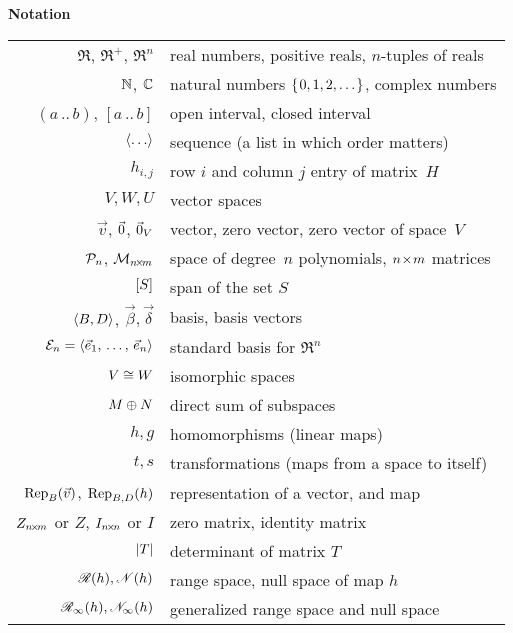 \thispagestyle{empty}
\begin{center}
  \textbf{Notation}  \\[2ex]
  \begin{tabular}{r|l}
    \( \Re \), \( \Re^+ \), \( \Re^n \) &real numbers, positive reals, $n$-tuples of reals \\
    \( \N              \),
    \( \C              \)  &natural numbers \( \set{0,1,2,\ldots} \), complex numbers                           \\
    \( (a\,..\,b) \), \( [a\,..\,b] \) &open interval, closed interval   \\
    \( \sequence{\ldots} \)&sequence (a list in which order matters)    \\
    \( h_{i,j} \)          &row \( i \) and column \( j \) entry of matrix~$H$ \\
    \( V,W,U \)            &vector spaces               \\
    \( \vec{v} \),
    $\zero$, $\zero_V$     &vector, zero vector, zero vector of space~$V$   \\
    \( \polyspace_n \), \( \matspace_{\nbym{n}{m}} \)  
                          &space of degree~\( n \) polynomials, \( \nbym{n}{m} \) matrices      \\
    \( \spanof{S} \)       &span of the set \( S \)                   \\
    \( \sequence{B,D} \), \( \vec{\beta},\vec{\delta} \)         
                          &basis, basis vectors  \\
    \( \stdbasis_n=\sequence{\vec{e}_1,\,\ldots,\,\vec{e}_n} \)         
                          &standard basis for $\Re^n$  \\
    \( V\isomorphicto W \) &isomorphic spaces                         \\
    \( M\directsum N \)    &direct sum of subspaces                   \\
    \( h,g \)              &homomorphisms (linear maps)                \\
    \( t,s \)              &transformations (maps from a space to itself) \\
    \( \rep{\vec{v}}{B} \), \( \rep{h}{B,D} \)     
                          &representation of a vector, and map    \\
    \( Z_{\nbym{n}{m}} \) or \( Z \), \(I_{\nbyn{n}}\) or \( I \)  &zero matrix, identity matrix    \\
    \( \deter{T} \)        &determinant of matrix \( T \)         \\
    \( \rangespace{h},\nullspace{h} \)
                           &range space,  null space of map \( h \) \\
    \( \genrangespace{h},\gennullspace{h} \)
                           &generalized range space and null space
  \end{tabular}
\end{center}
